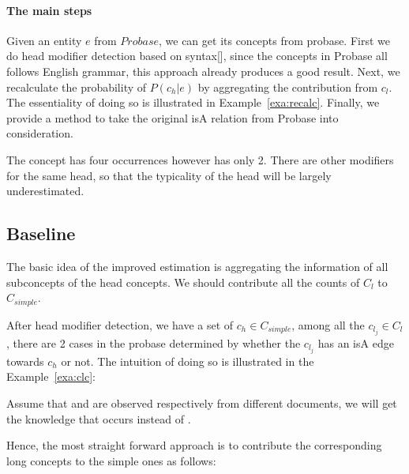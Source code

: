 
\paragraph{The main steps}
Given an entity $e$ from $Probase$, we can get its concepts from probase. First we do head modifier detection based on syntax[], since the concepts in Probase all follows English grammar, this approach already produces a good result. Next, we recalculate the probability of $P({c_h}|e)$ by aggregating the contribution from $c_l$. The essentiality of doing so is illustrated in Example~\ref{exa:recalc}. Finally, we provide a method to take the original isA relation from Probase into consideration.




\begin{example}
\label{exa:recalc}
 The concept has four occurrences however  has only 2. There are other modifiers for the same head, so that the typicality of the head will be largely underestimated.
\end{example}



\subsection{Baseline}

The basic idea of the improved estimation is aggregating the information of all subconcepts of the head concepts.  We should contribute all the counts of $C_{l}$ to $C_{simple}$.


After head modifier detection, we have a set of ${c_h} \in C_{simple}$, among all the $c_{l_j}\in C_{l}$, there are 2 cases in the probase determined by whether the $c_{l_j}$ has an isA edge towards ${c_h}$ or not.
The intuition of doing so is illustrated in the Example~\ref{exa:clc}:

\begin{example}
\label{exa:clc}
Assume that   and  are observed respectively  from different documents, we will get the knowledge that  occurs  instead of .
\end{example}

Hence, the most straight forward approach is to contribute the corresponding long concepts to the simple ones as follows:


